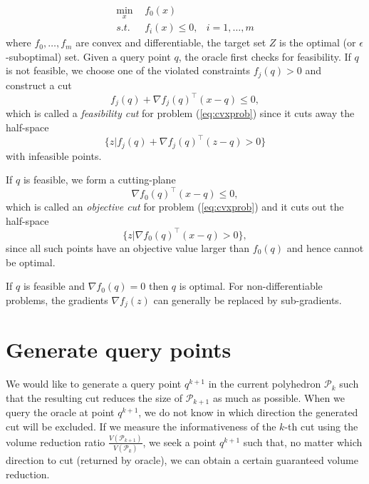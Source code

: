 \documentclass[twocolumn,a4wide,9pt]{extarticle}
\newcommand{\eat}[1]{}
\begin{document}
\begin{align}
\label{eq:cvxprob}
\min_{x} ~& f_0(x)        & \\
s.t.~~   ~& f_i(x) \le 0, & i = 1, \dots, m
\end{align} 
where $f_0, \dots, f_m$ are convex and differentiable, the target set $Z$ is the optimal (or $\epsilon$-suboptimal) set.
Given a query point $q$, the oracle first checks for feasibility.
If $q$ is not feasible, we choose one of the violated constraints $f_j(q) > 0$ and construct a cut
\begin{equation*}
f_j(q) + \nabla f_j(q)^\top (x - q) \le 0,
\end{equation*}
which is called a \textit{feasibility cut} for problem (\ref{eq:cvxprob}) since it cuts away the half-space 
\begin{equation*}
\{z | f_j(q) + \nabla f_j(q)^\top (z - q) > 0 \}
\end{equation*}
with infeasible points.

\eat{
Proof of infeasibility.
}

If $q$ is feasible, we form a cutting-plane
\begin{equation*}
\nabla f_0(q)^\top (x - q) \le 0,
\end{equation*}
which is called an \textit{objective cut} for problem (\ref{eq:cvxprob}) and it cuts out the half-space
\begin{equation*}
\{z | \nabla f_0(q)^\top (x - q) > 0 \},
\end{equation*}
since all such points have an objective value larger than $f_0(q)$ and hence cannot be optimal.

\eat{
Proof of non-optimal.
}

If $q$ is feasible and $\nabla f_0(q) = 0$ then $q$ is optimal.
For non-differentiable problems, the gradients $\nabla f_j(z)$ can generally be replaced by sub-gradients.


\section{Generate query points}
We would like to generate a query point $q^{k+1}$ in the current polyhedron $\mathcal{P}_{k}$ such that 
the resulting cut reduces the size of $\mathcal{P}_{k+1}$ as much as possible.
When we query the oracle at point $q^{k+1}$, we do not know in which direction the generated cut will be excluded.
If we measure the informativeness of the $k$-th cut using the volume reduction ratio $\frac{V(\mathcal{P}_{k+1})}{V(\mathcal{P}_{k})}$,
we seek a point $q^{k+1}$ such that, no matter which direction to cut (returned by oracle), we can obtain a certain guaranteed volume reduction.
\end{document}
